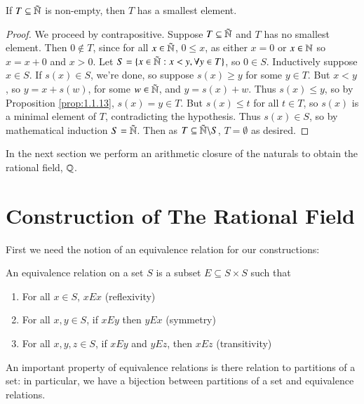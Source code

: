 \begin{namthm}\label{namthm:wellOrder}
    If $T \subseteq \tilde{\mathbb N}$ is non-empty, then $T$ has a smallest element.
\end{namthm}
\begin{proof}
    We proceed by contrapositive. Suppose $T \subseteq \tilde{\mathbb N}$ and $T$ has no smallest element. Then $0 \notin T$, since for all $x \in \tilde{\mathbb N}$, $0 \leq x$, as either $x = 0$ or $x \in \mathbb N$ so $x = x+0$ and $x > 0$. Let $S = \{x \in \tilde{\mathbb N}:x < y,\forall y \in T\}$, so $0 \in S$. Inductively suppose $x \in S$. If $s(x) \in S$, we're done, so suppose $s(x) \geq y$ for some $y \in T$. But $x < y$, so $y = x+s(w)$, for some $w \in \tilde{\mathbb N}$, and $y = s(x)+w$. Thus $s(x) \leq y$, so by Proposition \ref{prop:1.1.13}, $s(x) = y \in T$. But $s(x) \leq t$ for all $t \in T$, so $s(x)$ is a minimal element of $T$, contradicting the hypothesis. Thus $s(x) \in S$, so by mathematical induction $S = \tilde{\mathbb N}$. Then as $T \subseteq \tilde{\mathbb N}\backslash S$, $T = \emptyset$ as desired.
\end{proof}

In the next section we perform an arithmetic closure of the naturals to obtain the rational field, $\mathbb Q$.


\section{Construction of The Rational Field}

First we need the notion of an equivalence relation for our constructions:

\begin{defn}
    An equivalence relation on a set $S$ is a subset $E \subseteq S\times S$ such that \begin{enumerate}
        \item For all $x \in S$, $xEx$ (reflexivity) 
        \item For all $x,y \in S$, if $xEy$ then $yEx$ (symmetry) 
        \item For all $x,y,z \in S$, if $xEy$ and $yEz$, then $xEz$ (transitivity)
    \end{enumerate}
\end{defn}

An important property of equivalence relations is there relation to partitions of a set: in particular, we have a bijection between partitions of a set and equivalence relations.

